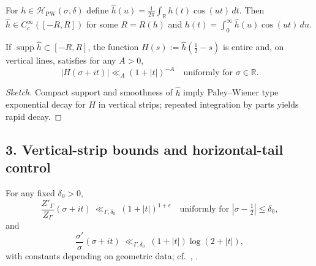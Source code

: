 \begin{definition}\relax\hspace{0pt}
\label{def:tfc2-cos} %
For $h\in\mathcal{H}_{\mathrm{PW}}(\sigma,\delta)$ define $\widehat{h}(u)=\frac{1}{2\pi}\int_{\mathbb{R}}h(t)\cos(ut)\,dt$. Then $\widehat{h}\in C_c^\infty([-R,R])$ for some $R=R(h)$ and $h(t)=\int_0^\infty \widehat{h}(u)\cos(ut)\,du$.\relax\hspace{0pt}
\end{definition}

\begin{lemma}\relax\hspace{0pt}
\label{lem:tfc2-bdry} %
If $\operatorname{supp}\widehat{h}\subset[-R,R]$, the function $H(s):=\widehat{h}(\tfrac12-s)$ is entire and, on vertical lines, satisfies for any $A>0$,
\[
|H(\sigma+it)|\ll_A (1+|t|)^{-A}\quad\text{uniformly for }\sigma\in\mathbb{R}.
\]
\end{lemma}

\begin{proof}[Sketch]\relax\hspace{0pt}
Compact support and smoothness of $\widehat{h}$ imply Paley--Wiener type exponential decay for $H$ in vertical strips; repeated integration by parts yields rapid decay.\relax\hspace{0pt}
\end{proof}

\subsection*{3. Vertical-strip bounds and horizontal-tail control}\relax\hspace{0pt}
\label{subsec:tfc2-bounds} %

\begin{lemma}\relax\hspace{0pt}
\label{lem:tfc2-vert} %
For any fixed $\delta_0>0$,
\[
\frac{Z'_\Gamma}{Z_\Gamma}(\sigma+it)\ \ll_{\Gamma,\delta_0}\ (1+|t|)^{1+\epsilon}
\quad \text{uniformly for } |\sigma-\tfrac12|\le\delta_0,
\]
and
\[
\frac{\sigma'}{\sigma}(\sigma+it)\ \ll_{\Gamma,\delta_0}\ (1+|t|)\log(2+|t|),
\]
with constants depending on geometric data; cf.\ \cite[Ch.~10]{IwaniecSpectral}, \cite[Ch.~7]{Borthwick}.\relax\hspace{0pt}
\end{lemma}

